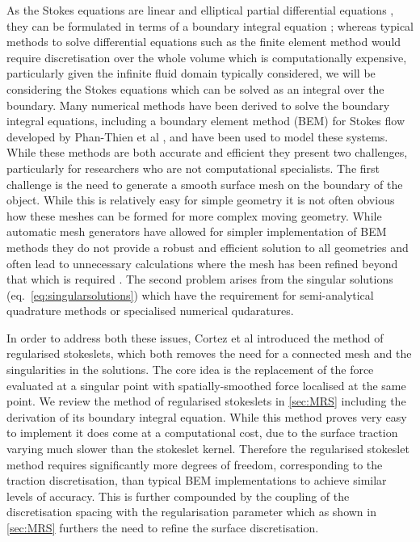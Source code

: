 As the Stokes equations are linear and elliptical partial differential equations \cite{Pozrikidis1992BoundaryFlow}, they can be formulated in terms of a boundary integral equation \cite{Pozrikidis2002ABEMLIB,Acrivos1975StokesSolution,Pozrikidis1992BoundaryFlow,Tran-Cong1987APropulsion,Stakgold1968Boundary2}; whereas typical methods to solve differential equations such as the finite element method \cite{Wagner2001,Kouhia1995} would require discretisation over the whole volume which is computationally expensive, particularly given the infinite fluid domain typically considered, we will be considering the Stokes equations which can be solved as an integral over the boundary. Many numerical methods have been derived to solve the boundary integral equations, including a boundary element method (BEM) for Stokes flow developed by Phan-Thien et al \cite{Tran-Cong1987APropulsion}, and have been used to model these systems. While these methods are both accurate and efficient they present two challenges, particularly for researchers who are not computational specialists. The first challenge is the need to generate a smooth surface mesh on the boundary of the object. While this is relatively easy for simple geometry it is not often obvious how these meshes can be formed for more complex moving geometry. While automatic mesh generators \cite{Pozrikidis2002ABEMLIB,gmsh,schroeder2006visualization} have allowed for simpler implementation of BEM methods they do not provide a robust and efficient solution to all geometries and often lead to unnecessary calculations where the mesh has been refined beyond that which is required \cite{gmsh,schroeder2006visualization}. The second problem arises from the singular solutions (eq.~\ref{eq:singularsolutions}) which have the requirement for semi-analytical quadrature methods or specialised numerical qudaratures.

In order to address both these issues, Cortez et al \cite{Cortez2001,Cortez2005} introduced the method of regularised stokeslets, which both removes the need for a connected mesh and the singularities in the solutions. The core idea is the replacement of the force evaluated at a singular point with spatially-smoothed force localised at the same point. We review the method of regularised stokeslets in \cref{sec:MRS} including the derivation of its boundary integral equation. While this method proves very easy to implement it does come at a computational cost, due to the surface traction varying much slower than the stokeslet kernel. Therefore the regularised stokeslet method requires significantly more degrees of freedom, corresponding to the traction discretisation, than typical BEM implementations to achieve similar levels of accuracy. This is further compounded by the coupling of the discretisation spacing with the regularisation parameter which as shown in \cref{sec:MRS} furthers the need to refine the surface discretisation. 

